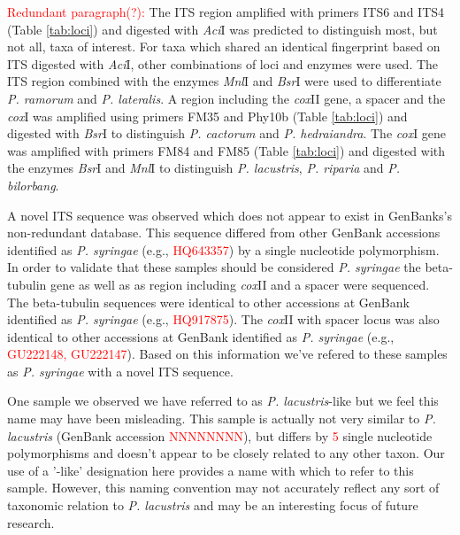 \documentclass[12pt]{article}
\begin{document}
\textcolor{red}{Redundant paragraph(?):}
  The ITS region amplified with primers ITS6 and ITS4 (Table \ref{tab:loci}) and digested with \emph{Aci}I was predicted to distinguish most, but not all, taxa of interest.  For taxa which shared an identical fingerprint based on ITS digested with \emph{Aci}I, other combinations of loci and enzymes were used.  The ITS region combined with the enzymes \emph{Mnl}I and \emph{Bsr}I were used to differentiate \emph{P. ramorum} and \emph{P. lateralis}.  A region including the \emph{cox}II gene, a spacer and the \emph{cox}I was amplified using primers FM35 and Phy10b (Table \ref{tab:loci}) and digested with \emph{Bsr}I to distinguish \emph{P. cactorum} and \emph{P. hedraiandra}.  The \emph{cox}I gene was amplified with primers FM84 and FM85 (Table \ref{tab:loci}) and digested with the enzymes \emph{Bsr}I and \emph{Mnl}I to distinguish \emph{P. lacustris}, \emph{P. riparia} and \emph{P. bilorbang}.






A novel ITS sequence was observed which does not appear to exist in GenBanks's non-redundant database.  This sequence differed from other GenBank accessions identified as \emph{P. syringae} (e.g., \textcolor{red}{HQ643357}) by a single nucleotide polymorphism.  In order to validate that these samples should be considered \emph{P. syringae} the beta-tubulin gene as well as as region including \emph{cox}II and a spacer were sequenced.  The beta-tubulin sequences were identical to other accessions at GenBank identified as \emph{P. syringae} (e.g., \textcolor{red}{HQ917875}).  The \emph{cox}II with spacer locus was also identical to other accessions at GenBank identified as \emph{P. syringae} (e.g., \textcolor{red}{GU222148, GU222147}).  Based on this information we've refered to these samples as \emph{P. syringae} with a novel ITS sequence.

One sample we observed we have referred to as \emph{P. lacustris}-like but we feel this name may have been misleading.  This sample is actually not very similar to \emph{P. lacustris} (GenBank accession \textcolor{red}{NNNNNNNN}), but differs by \textcolor{red}{5} single nucleotide polymorphisms and doesn't appear to be closely related to any other taxon.  Our use of a '-like' designation here provides a name with which to refer to this sample.  However, this naming convention may not accurately reflect any sort of taxonomic relation to \emph{P. lacustris} and may be an interesting focus of future research.
\end{document}
